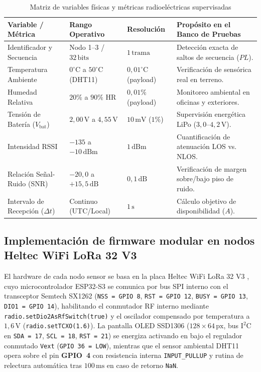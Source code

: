 \documentclass[12pt,oneside,openany,spanish,oldfontcommands]{memoir}
\begin{document}
\begin{table}[!htbp]
\centering
\small
\setlength{\tabcolsep}{3pt}
\caption{Matriz de variables físicas y métricas radioeléctricas supervisadas}\label{tab:dashboard-kpis-diseno}
\begin{tabularx}{\textwidth}{>{\raggedright\arraybackslash}p{3.2cm} >{\centering\arraybackslash}p{2.1cm} >{\centering\arraybackslash}p{1.8cm} >{\raggedright\arraybackslash}X}
\toprule
\textbf{Variable / Métrica} & \textbf{Rango Operativo} & \textbf{Resolución} & \textbf{Propósito en el Banco de Pruebas} \\
\midrule
Identificador y Secuencia & Nodo 1--3 / $32\,\text{bits}$ & $1\,\text{trama}$ & Detección exacta de saltos de secuencia ($PL$). \\
Temperatura Ambiente & $0^\circ\text{C}$ a $50^\circ\text{C}$ (DHT11) & $0,01^\circ\text{C}$ (payload) & Verificación de sensórica real en terreno. \\
Humedad Relativa & $20\%$ a $90\%$ HR & $0,01\%$ (payload) & Monitoreo ambiental en oficinas y exteriores. \\
Tensión de Batería ($V_{\text{bat}}$) & $2,00\,\text{V}$ a $4,55\,\text{V}$ & $10\,\text{mV}$ ($1\%$) & Supervisión energética LiPo ($3,0\text{--}4,2\,\text{V}$). \\
Intensidad RSSI & $-135$ a $-10\,\text{dBm}$ & $1\,\text{dBm}$ & Cuantificación de atenuación LOS vs. NLOS. \\
Relación Señal-Ruido (SNR) & $-20,0$ a $+15,5\,\text{dB}$ & $0,1\,\text{dB}$ & Verificación de margen sobre/bajo piso de ruido. \\
Intervalo de Recepción ($\Delta t$) & Continuo (UTC/Local) & $1\,\text{s}$ & Cálculo objetivo de disponibilidad ($A$). \\
\bottomrule
\end{tabularx}
\end{table}

\subsection{Implementación de firmware modular en nodos Heltec WiFi LoRa 32 V3}

El hardware de cada nodo sensor se basa en la placa Heltec WiFi LoRa 32 V3 \parencite{heltec_v3},
cuyo microcontrolador ESP32-S3 se comunica por bus SPI interno con el transceptor Semtech SX1262
(\texttt{NSS = GPIO 8}, \texttt{RST = GPIO 12}, \texttt{BUSY = GPIO 13}, \texttt{DIO1 = GPIO 14}),
habilitando el conmutador RF interno mediante \texttt{radio.setDio2AsRfSwitch(true)} y el oscilador
compensado por temperatura a $1,6\,\text{V}$ (\texttt{radio.setTCXO(1.6)}). La pantalla OLED
SSD1306 ($128\times 64\,\text{px}$, bus $\text{I}^2\text{C}$ en \texttt{SDA = 17}, \texttt{SCL = 18},
\texttt{RST = 21}) se energiza activando en bajo el regulador conmutado \texttt{Vext}
(\texttt{GPIO 36 = LOW}), mientras que el sensor ambiental DHT11 opera sobre el pin \textbf{GPIO~4}
con resistencia interna \texttt{INPUT\_PULLUP} y rutina de relectura automática tras $100\,\text{ms}$
en caso de retorno \texttt{NaN}.
\end{document}
